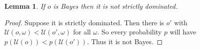 \documentclass[a4paper]{article}
\newtheorem{theorem}{Theorem}
\newtheorem{lemma}[theorem]{Lemma}
\renewcommand\O{\mathcal{O}}
\newcommand\Uwald{\mathcal{U}} %
\newenvironment{CCM rewritten}
{\begingroup\color{blue}} %
{\endgroup}              %
\begin{document}
	
	
	
	
	
	\begin{lemma}\label{thm:cct:Bayes implies admiss}
		If $o$ is Bayes then it is not strictly dominated.
	\end{lemma}
	\begin{proof}
		Suppose it is strictly dominated. Then there is $o'$ with $\Uwald(o,\omega)<\Uwald(o',\omega)$ for all $\omega$. So every probability $p$ will have $p( \Uwald(o))<p(\Uwald(o'))$. Thus it is not Bayes.
	\end{proof}
	
\end{document}
